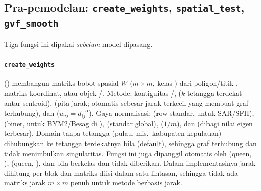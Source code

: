 
\subsection{Pra-pemodelan: \texttt{create\_weights}, \texttt{spatial\_test}, \texttt{gvf\_smooth}}\label{sec:pra-model}

Tiga fungsi ini dipakai \emph{sebelum} model dipasang.

\paragraph{\texttt{create\_weights}} () membangun
matriks bobot spasial $W$ ($m\times m$, kelas ) dari
poligon/titik , matriks koordinat, atau objek /.
Metode: kontiguitas /,  ($k$ tetangga
terdekat antar-sentroid),  (pita jarak;  otomatis
sebesar jarak terkecil yang membuat graf terhubung), dan 
($w_{ij}=d_{ij}^{-\alpha}$). Gaya normalisasi:  (row-standar, untuk
SAR/SFH),  (biner, untuk BYM2/Besag di ),  (standar
global),  ($1/m$), dan  (dibagi nilai eigen terbesar).
Domain tanpa tetangga (pulau, mis.\ kabupaten kepulauan) dihubungkan ke
 tetangga terdekatnya bila 
(default), sehingga graf terhubung dan tidak menimbulkan singularitas.
Fungsi ini juga dipanggil otomatis oleh  (queen, ),
 (queen, ), dan  bila 
berkelas  dan  tidak diberikan. Dalam implementasinya jarak
dihitung per blok dan matriks diisi dalam satu lintasan, sehingga tidak ada
matriks jarak $m\times m$ penuh untuk metode berbasis jarak.


